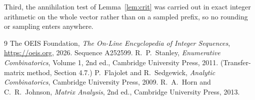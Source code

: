 \documentclass[11pt,a4paper]{article}
\theoremstyle{plain}
\theoremstyle{definition}
\begin{document}
Third, the annihilation test of Lemma~\ref{lem:crit} was carried out in exact integer
arithmetic on the whole vector rather than on a sampled prefix, so no rounding or sampling
enters anywhere.

\begin{thebibliography}{9}
 The OEIS Foundation, \emph{The On-Line Encyclopedia of Integer
Sequences}, \url{https://oeis.org}, 2026. Sequence A252599.
 R.~P.~Stanley, \emph{Enumerative Combinatorics}, Volume 1, 2nd ed.,
Cambridge University Press, 2011. (Transfer-matrix method, Section 4.7.)
 P.~Flajolet and R.~Sedgewick, \emph{Analytic Combinatorics}, Cambridge
University Press, 2009.
 R.~A.~Horn and C.~R.~Johnson, \emph{Matrix Analysis}, 2nd ed., Cambridge
University Press, 2013.
\end{thebibliography}
\end{document}
